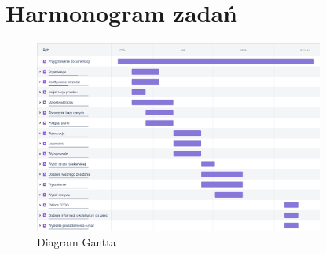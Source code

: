 \documentclass[a4paper,11pt]{uzreport}
\begin{document}
\clearpage
\section{Harmonogram zadań}
    
    \begin{figure}[ht!]
	\vspace{-15pt}
        \centering
        \includegraphics[width=0.85\textwidth]{pictures/fabulous_uz_planner_2020-10-27_06.13pm.png}
        \caption{Diagram Gantta}
	\vspace{-30pt}
     \end{figure}
\end{document}
